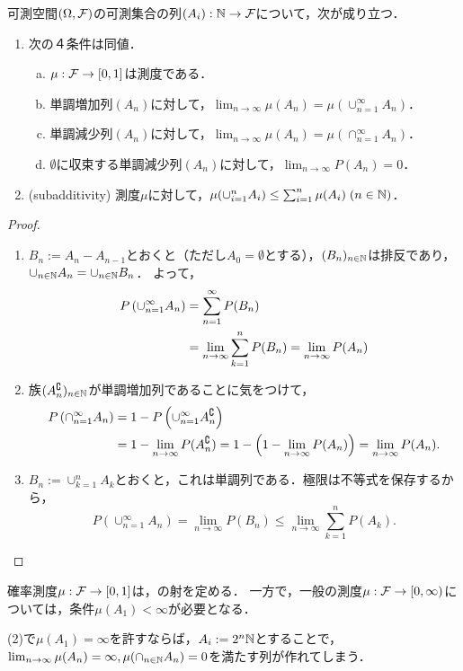\documentclass[uplatex,dvipdfmx]{jsreport}
\begin{document}
\begin{proposition}[測度の連続性と劣加法性]\label{prop-character-of-measurable-sets}
    可測空間$(\Omega,\mathcal{F})$の可測集合の列$(A_i):\mathbb{N}\to\mathcal{F}$について，次が成り立つ．
    \begin{enumerate}
        \item 次の４条件は同値．
        \begin{enumerate}[(a)]
            \item $\mu:\mathcal{F}\to[0,1]$は測度である．
            \item 単調増加列$(A_n)$に対して，$\lim_{n\to\infty}\mu(A_n)=\mu(\cup_{n=1}^\infty A_n)$．
            \item 単調減少列$(A_n)$に対して，$\lim_{n\to\infty}\mu(A_n)=\mu(\cap_{n=1}^\infty A_n)$．
            \item $\emptyset$に収束する単調減少列$(A_n)$に対して，$\lim_{n\to\infty}P(A_n)=0$．
        \end{enumerate}
        \item (subadditivity) 測度$\mu$に対して，$\mu(\cup^n_{i=1}A_i)\le\sum^n_{i=1}\mu(A_i)\;(n\in\mathbb{N})$．
    \end{enumerate}
\end{proposition}
\begin{proof}\mbox{}
    \begin{enumerate}
        \item $B_n:=A_n-A_{n-1}$とおくと（ただし$A_0=\emptyset$とする），$(B_n)_{n\in\mathbb{N}}$は排反であり，$\cup_{n\in\mathbb{N}}A_n=\cup_{n\in\mathbb{N}}B_n$．
        よって，\begin{align*}
            P\left(\cup_{n=1}^\infty A_n\right)&=\sum^\infty_{n=1}P(B_n)\\
            &=\lim_{n\to\infty}\sum^n_{k=1}P(B_n)=\lim_{n\to\infty}P(A_n)
        \end{align*}
        \item 族$(A_n^\complement)_{n\in\mathbb{N}}$が単調増加列であることに気をつけて，
        \begin{align*}
            P\left(\cap^\infty_{n=1}A_n\right)&=1-P\left(\cup^\infty_{n=1}A_n^\complement\right)\\
            &=1-\lim_{n\to\infty}P(A_n^\complement)=1-\left(1-\lim_{n\to\infty}P(A_n)\right)=\lim_{n\to\infty}P(A_n).
        \end{align*}
        \item $B_n:=\cup_{k=1}^nA_k$とおくと，これは単調列である．極限は不等式を保存するから，
        \[P(\cup^\infty_{n=1}A_n)=\lim_{n\to\infty}P(B_n)\le\lim_{n\to\infty}\sum^n_{k=1}P(A_k).\]
    \end{enumerate}
\end{proof}
\begin{remarks}[連続写像としての測度]
    確率測度$\mu:\mathcal{F}\to[0,1]$は，の射を定める．
    一方で，一般の測度$\mu:\mathcal{F}\to[0,\infty)$については，条件$\mu(A_1)<\infty$が必要となる．
\end{remarks}
\begin{remark}\label{remark-topology-of-sigma-algebra}
    (2)で$\mu(A_1)=\infty$を許すならば，$A_i:=2^n\mathbb{N}$とすることで，$\lim_{n\to\infty}\mu(A_n)=\infty,\mu(\cap_{n\in\mathbb{N}}A_n)=0$を満たす列が作れてしまう．
\end{remark}
\end{document}
